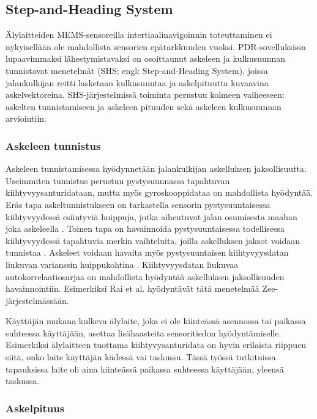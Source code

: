 \subsection{Step-and-Heading System}

Älylaitteiden MEMS-sensoreilla intertiaalinavigoinnin toteuttaminen ei
nykyisellään ole mahdollista sensorien epätarkkuuden vuoksi.  PDR-sovelluksissa
lupaavimmaksi lähestymistavaksi on osoittaunut askeleen ja kulkusuunnan
tunnistavat menetelmät (SHS; engl: Step-and-Heading System), joissa
jalankulkijan reitti lasketaan kulkusuuntaa ja askelpituutta kuvaavina
askelvektoreina. SHS-järjestelmissä toiminta perustuu kolmeen vaiheeseen:
askelten tunnistamiseen ja askeleen pituuden sekä askeleen kulkusuunnan
arviointiin.

\subsubsection{Askeleen tunnistus}

Askeleen tunnistamisessa hyödynnetään jalankulkijan askelluksen jaksollisuutta.
Useimmiten tunnistus perustuu pystysuunnassa tapahtuvan kiihtyvyysanturidataan,
mutta myös gyroskooppidataa on mahdollista hyödyntää.
Eräs tapa askeltunnistukseen
on tarkastella sensorin pystysuuntaisessa kiihtyvyydessä esiintyviä huippuja,
jotka aiheutuvat jalan osumisesta maahan joka askeleella \cite{wang2012}.
Toinen tapa on havainnoida pystysuuntaisessa todellisessa kiihtyvyydessä
tapahtuvia merkin vaihteluita, joilla askelluksen jaksot voidaan tunnistaa
\cite{fadjukoff2013}. Askeleet voidaan havaita myös pystysuuntaisen
kiihtyvyysdatan liukuvan varianssin huippukohtina \cite{steinhoff2010}.
Kiihtyvyysdatan liukuvaa autokorrelaatiosarjaa on mahdollista hyödyntää
askelluksen jaksollisuuden havainnointiin. Esimerkiksi Rai et al.
\cite{rai2012} hyödyntävät tätä menetelmää Zee-järjestelmässään.

Käyttäjän mukana kulkeva älylaite, joka ei ole kiinteässä asennossa
tai paikassa suhteessa käyttäjään, asettaa lisähaasteita sensoritiedon
hyödyntämiselle. Esimerkiksi älylaitteen tuottama kiihtyvysanturidata
on hyvin erilaista riippuen siitä, onko laite käyttäjän kädessä vai
taskussa. Tässä työssä tutkituissa tapauksissa laite oli aina kiinteässä
paikassa suhteessa käyttäjään, yleensä taskussa.

\subsubsection{Askelpituus}

